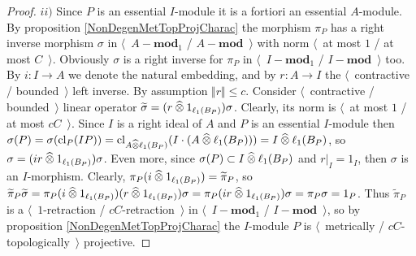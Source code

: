 \begin{proof}
$ii)$ Since $P$ is an essential $I$-module it is a fortiori an essential $A$-module. By proposition \ref{NonDegenMetTopProjCharac} the morphism $\pi_P$ has a right inverse morphism $\sigma$ in $\langle$~$A-\mathbf{mod}_1$ / $A-\mathbf{mod}$~$\rangle$ with norm $\langle$~at most $1$ / at most $C$~$\rangle$. Obviously $\sigma$ is a right inverse for $\pi_P$ in $\langle$~$I-\mathbf{mod}_1$ / $I-\mathbf{mod}$~$\rangle$ too. By $i:I\to A$ we denote the natural embedding, and by $r:A\to I$ the $\langle$~contractive / bounded~$\rangle$ left inverse. By assumption $\Vert r\Vert\leq c$. Consider $\langle$~contractive / bounded~$\rangle$ linear operator $\widetilde{\sigma}=(r\mathbin{\widehat{\otimes}} 1_{\ell_1(B_P)})\sigma$. Clearly, its norm is $\langle$~at most $1$ / at most $cC$~$\rangle$. Since $I$ is a right ideal of $A$ and $P$ is an essential $I$-module then $\sigma(P)=\sigma(\operatorname{cl}_P(IP))=\operatorname{cl}_{A\mathbin{\widehat{\otimes}} \ell_1(B_P)}(I\cdot (A\mathbin{\widehat{\otimes}} \ell_1(B_P)))=I\mathbin{\widehat{\otimes}} \ell_1(B_P)$, so $\sigma=(ir\mathbin{\widehat{\otimes}} 1_{\ell_1(B_P)})\sigma$. Even more, since $\sigma(P)\subset I\mathbin{\widehat{\otimes}}\ell_1(B_P)$ and $r|_I=1_I$, then $\sigma$ is an $I$-morphism. Clearly, $\pi_P(i\mathbin{\widehat{\otimes}} 1_{\ell_1(B_P)})=\widetilde{\pi}_P$, so $\widetilde{\pi}_P\widetilde{\sigma}=\pi_P(i\mathbin{\widehat{\otimes}} 1_{\ell_1(B_P)})(r\mathbin{\widehat{\otimes}} 1_{\ell_1(B_P)})\sigma=\pi_P(ir\mathbin{\widehat{\otimes}} 1_{\ell_1(B_P)})\sigma=\pi_P\sigma=1_P$. Thus $\widetilde{\pi}_P$ is a $\langle$~$1$-retraction / $cC$-retraction~$\rangle$ in $\langle$~$I-\mathbf{mod}_1$ / $I-\mathbf{mod}$~$\rangle$, so by proposition \ref{NonDegenMetTopProjCharac} the $I$-module $P$ is $\langle$~metrically / $cC$-topologically~$\rangle$ projective.
\end{proof}

